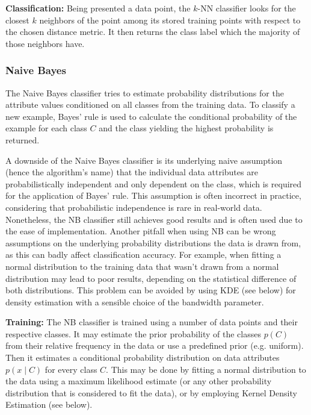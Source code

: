 \documentclass[
	ruledheaders=chapter,
	class=report,
	thesis={type=master, department=inf},
	accentcolor=1c,
	custommargins=true,
	marginpar=false,
	parskip=half-,
	fontsize=11pt,
]{tudapub}
\begin{document}
	\textbf{Classification:} Being presented a data point, the $k$-NN classifier looks for the closest $k$ neighbors of the point among its stored training points with respect to the chosen distance metric. It then returns the class label which the majority of those neighbors have.
		
	\subsubsection{Naive Bayes} 
	
	The Naive Bayes classifier tries to estimate probability distributions for the attribute values conditioned on all classes from the training data. To classify a new example, Bayes' rule is used to calculate the conditional probability of the example for each class $C$ and the class yielding the highest probability is returned. 
	
	A downside of the Naive Bayes classifier is its underlying naive assumption (hence the algorithm's name) that the individual data attributes are probabilistically independent and only dependent on the class, which is required for the application of Bayes' rule. This assumption is often incorrect in practice, considering that probabilistic independence is rare in real-world data. Nonetheless, the NB classifier still achieves good results and is often used due to the ease of implementation. Another pitfall when using NB can be wrong assumptions on the underlying probability distributions the data is drawn from, as this can badly affect classification accuracy. For example, when fitting a normal distribution to the training data that wasn't drawn from a normal distribution may lead to poor results, depending on the statistical difference of both distributions. This problem can be avoided by using KDE (see below) for density estimation with a sensible choice of the bandwidth parameter.
	
	\textbf{Training:} The NB classifier is trained using a number of data points and their respective classes. It may estimate the prior probability of the classes $p(C)$ from their relative frequency in the data or use a predefined prior (e.g. uniform). Then it estimates a conditional probability distribution on data attributes $p(x \mid C)$ for every class $C$. This may be done by fitting a normal distribution to the data using a maximum likelihood estimate (or any other probability distribution that is considered to fit the data), or by employing Kernel Density Estimation (see below). 
	
\end{document}

